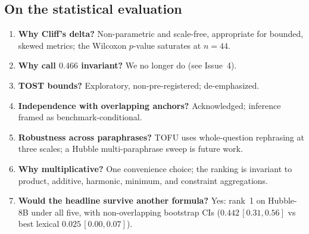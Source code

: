 \documentclass[11pt,a4paper]{article}
\begin{document}
\subsection*{On the statistical evaluation}
\begin{enumerate}[label=\arabic*.,start=15]
\item \textbf{Why Cliff's delta?} Non-parametric and scale-free, appropriate for bounded, skewed metrics;
the Wilcoxon $p$-value saturates at $n=44$.
\item \textbf{Why call $0.466$ invariant?} We no longer do (see Issue~4).
\item \textbf{TOST bounds?} Exploratory, non-pre-registered; de-emphasized.
\item \textbf{Independence with overlapping anchors?} Acknowledged; inference framed as
benchmark-conditional.
\item \textbf{Robustness across paraphrases?} TOFU uses whole-question rephrasing at three scales; a
Hubble multi-paraphrase sweep is future work.
\item \textbf{Why multiplicative?} One convenience choice; the ranking is invariant to product, additive,
harmonic, minimum, and constraint aggregations.
\item \textbf{Would the headline survive another formula?} Yes: rank~1 on Hubble-8B under all five, with
non-overlapping bootstrap CIs ($0.442\,[0.31,0.56]$ vs best lexical $0.025\,[0.00,0.07]$).
\end{enumerate}
\end{document}
